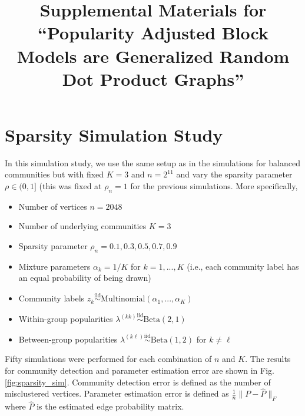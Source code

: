 \documentclass[
  12pt,
]{article}
\title{Supplemental Materials for ``Popularity Adjusted Block Models are
Generalized Random Dot Product Graphs''}
\author{}
\date{\vspace{-2.5em}}
\providecommand{\tightlist}{%
  \setlength{\itemsep}{0pt}\setlength{\parskip}{0pt}}
\begin{document}
\maketitle

\newcommand{\diag}{\mathrm{diag}}
\newcommand{\tr}{\mathrm{Tr}}
\newcommand{\blockdiag}{\mathrm{blockdiag}}
\newcommand{\indep}{\stackrel{\mathrm{ind}}{\sim}}
\newcommand{\iid}{\stackrel{\mathrm{iid}}{\sim}}
\newcommand{\Bernoulli}{\mathrm{Bernoulli}}
\newcommand{\Betadist}{\mathrm{Beta}}
\newcommand{\BG}{\mathrm{BernoulliGraph}}
\newcommand{\PABM}{\mathrm{PABM}}
\newcommand{\RDPG}{\mathrm{RDPG}}
\newcommand{\GRDPG}{\mathrm{GRDPG}}
\newcommand{\Multinomial}{\mathrm{Multinomial}}

\hypertarget{sparsity-simulation-study}{%
\section{Sparsity Simulation Study}\label{sparsity-simulation-study}}

In this simulation study, we use the same setup as in the simulations
for balanced communities but with fixed \(K = 3\) and \(n = 2^{11}\) and
vary the sparsity parameter \(\rho \in (0, 1]\) (this was fixed at
\(\rho_n = 1\) for the previous simulations. More specifically,

\begin{itemize}
\tightlist
\item
  Number of vertices \(n = 2048\)
\item
  Number of underlying communities \(K = 3\)
\item
  Sparsity parameter \(\rho_n = 0.1, 0.3, 0.5, 0.7, 0.9\)
\item
  Mixture parameters \(\alpha_k = 1 / K\) for \(k = 1, ..., K\) (i.e.,
  each community label has an equal probability of being drawn)
\item
  Community labels
  \(z_k \stackrel{\mathrm{iid}}{\sim}\mathrm{Multinomial}(\alpha_1, ..., \alpha_K)\)
\item
  Within-group popularities
  \(\lambda^{(kk)} \stackrel{\mathrm{iid}}{\sim}\mathrm{Beta}(2, 1)\)
\item
  Between-group popularities
  \(\lambda^{(k \ell)} \stackrel{\mathrm{iid}}{\sim}\mathrm{Beta}(1, 2)\)
  for \(k \neq \ell\)
\end{itemize}

Fifty simulations were performed for each combination of \(n\) and
\(K\). The results for community detection and parameter estimation
error are shown in Fig. \ref{fig:sparsity_sim}. Community detection
error is defined as the number of misclustered vertices. Parameter
estimation error is defined as \(\frac{1}{n} \|P - \hat{P}\|_F\) where
\(\hat{P}\) is the estimated edge probability matrix.
\end{document}
